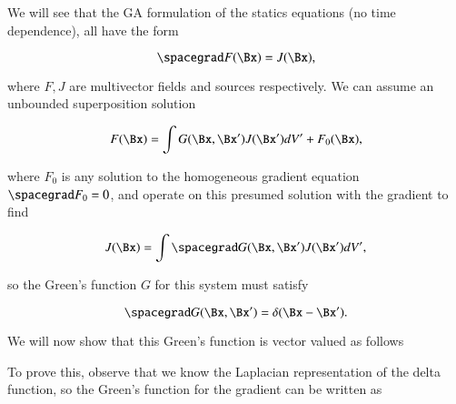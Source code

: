 %
%


We will see that the GA formulation of the statics equations (no time dependence), all have the form

\begin{dmath}\label{eqn:greensFunctionGradient:420}
\spacegrad F(\Bx) = J(\Bx),
\end{dmath}

where \( F, J \) are multivector fields and sources respectively.  We can assume an unbounded superposition solution

\begin{dmath}\label{eqn:greensFunctionGradient:440}
F(\Bx) = \int G(\Bx, \Bx') J(\Bx') dV' + F_0(\Bx),
\end{dmath}

where \( F_0 \) is any solution to the homogeneous gradient equation \( \spacegrad F_0 = 0 \), and operate on this presumed solution with the gradient to find

\begin{dmath}\label{eqn:greensFunctionGradient:460}
J(\Bx)
= \int \spacegrad G(\Bx, \Bx') J(\Bx') dV',
\end{dmath}

so the Green's function \( G \) for this system must satisfy

\begin{dmath}\label{eqn:greensFunctionGradient:480}
\spacegrad G(\Bx, \Bx') = \delta( \Bx - \Bx' ).
\end{dmath}

We will now show that this Green's function is vector valued as follows


To prove this, observe that we know the Laplacian representation of the delta function, so
the Green's function for the gradient can be written as


